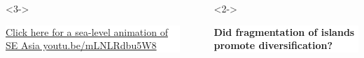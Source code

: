 {
\begin{frame}
    \begin{columns}

        \vspace{6.7cm}

        \begin{uncoverenv}<3->
        \colorbox{white}{
            \begin{minipage}[t]{0.45\textwidth}
                \raggedright
                \href{https://youtu.be/mLNLRdbu5W8}{Click here for a sea-level animation of SE Asia youtu.be/mLNLRdbu5W8}
            \end{minipage}
        }
        \end{uncoverenv}

        \ \\


        \vspace{-2cm}

        \begin{uncoverenv}<2->
        \colorbox{white}{
            \begin{minipage}[t]{1.0\textwidth}
                \raggedright
                \textbf{Did fragmentation of islands promote diversification?}
            \end{minipage}
        }
        \end{uncoverenv}
    \end{columns}
\end{frame}
}

